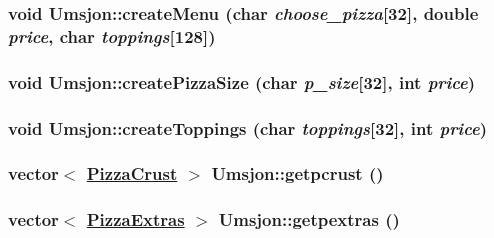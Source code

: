 \hypertarget{class_umsjon_ce183afe9e7ad9a7492ac2241e2481e5}{
\subsubsection[createMenu]{\setlength{\rightskip}{0pt plus 5cm}void Umsjon::create\-Menu (char {\em choose\_\-pizza}\mbox{[}32\mbox{]}, double {\em price}, char {\em toppings}\mbox{[}128\mbox{]})}}
\label{class_umsjon_ce183afe9e7ad9a7492ac2241e2481e5}


\hypertarget{class_umsjon_9b94d4f7ba3bbc2c46cc7bdce8f09d61}{
\subsubsection[createPizzaSize]{\setlength{\rightskip}{0pt plus 5cm}void Umsjon::create\-Pizza\-Size (char {\em p\_\-size}\mbox{[}32\mbox{]}, int {\em price})}}
\label{class_umsjon_9b94d4f7ba3bbc2c46cc7bdce8f09d61}


\hypertarget{class_umsjon_b4c5d68540dc069a5871e57482a44454}{
\subsubsection[createToppings]{\setlength{\rightskip}{0pt plus 5cm}void Umsjon::create\-Toppings (char {\em toppings}\mbox{[}32\mbox{]}, int {\em price})}}
\label{class_umsjon_b4c5d68540dc069a5871e57482a44454}


\hypertarget{class_umsjon_1ba4091781dbf5acfd11d9bbd3c476c1}{
\subsubsection[getpcrust]{\setlength{\rightskip}{0pt plus 5cm}vector$<$ \hyperlink{class_pizza_crust}{Pizza\-Crust} $>$ Umsjon::getpcrust ()}}
\label{class_umsjon_1ba4091781dbf5acfd11d9bbd3c476c1}


\hypertarget{class_umsjon_48a5a2fa53cb3c40c681bd053598876b}{
\subsubsection[getpextras]{\setlength{\rightskip}{0pt plus 5cm}vector$<$ \hyperlink{class_pizza_extras}{Pizza\-Extras} $>$ Umsjon::getpextras ()}}
\label{class_umsjon_48a5a2fa53cb3c40c681bd053598876b}


